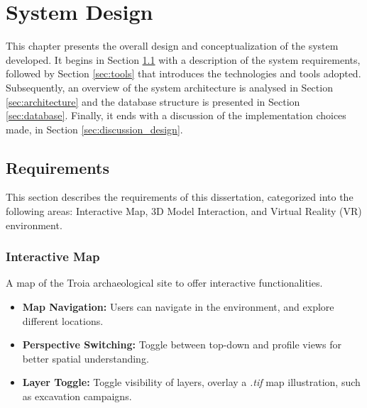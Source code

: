 
%
\chapter{System Design}
\label{cha:system_design}
This chapter presents the overall design and conceptualization of the system developed. It begins in Section \ref{sec:requirements} with a description of the system requirements, followed by Section \ref{sec:tools} that introduces the technologies and tools adopted.
Subsequently, an overview of the system architecture is analysed in Section \ref{sec:architecture} and the database structure is presented in Section \ref{sec:database}.
Finally, it ends with a discussion of the implementation choices made, in Section \ref{sec:discussion_design}.

\section{Requirements}
\label{sec:requirements}

This section describes the requirements of this dissertation, categorized into the following areas: Interactive Map, \gls{3D} Model Interaction, and Virtual Reality (\gls{VR}) environment.

\subsection*{Interactive Map}
A map of the Troia archaeological site to offer interactive functionalities.
\begin{itemize}
    \item \textbf{Map Navigation:} Users can navigate in the environment, and explore different locations.
    \item \textbf{Perspective Switching:} Toggle between top-down and profile views for better spatial understanding.
    \item \textbf{Layer Toggle:} Toggle visibility of layers, overlay a \textit{.tif} map illustration, such as excavation campaigns.
\end{itemize}

